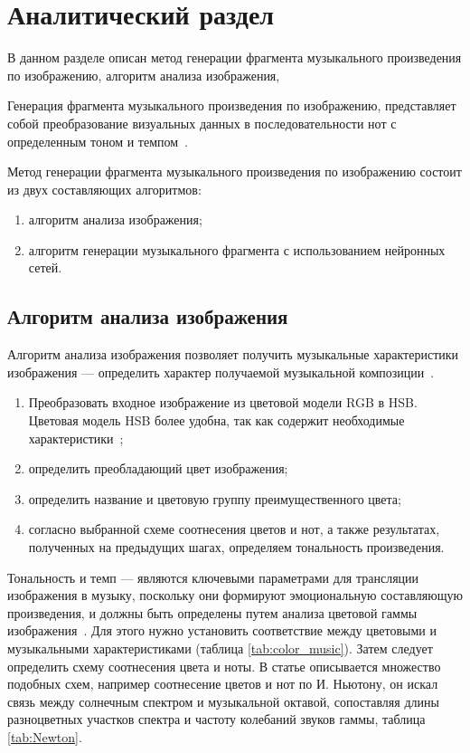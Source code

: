 \chapter{Аналитический раздел}

В данном разделе описан метод генерации фрагмента музыкального произведения по изображению, алгоритм анализа изображения, 

Генерация фрагмента музыкального произведения по изображению, представляет собой преобразование визуальных данных в последовательности нот с определенным тоном и темпом~\cite{alg}. 

Метод генерации фрагмента музыкального произведения по изображению состоит из двух составляющих алгоритмов: 
\begin{enumerate}
	\item алгоритм анализа изображения; %
	\item алгоритм генерации музыкального фрагмента с использованием нейронных сетей.
\end{enumerate}	

\section{Алгоритм анализа изображения}

Алгоритм анализа изображения позволяет получить музыкальные характеристики изображения --- определить характер получаемой музыкальной композиции~\cite{alg}.

\begin{enumerate}
	\item Преобразовать входное изображение из цветовой модели RGB в HSB.
	Цветовая модель HSB более удобна, так как содержит необходимые характеристики~\cite{alg};
	\item определить преобладающий цвет изображения;
	\item определить название и цветовую группу преимущественного цвета;
	\item согласно выбранной схеме соотнесения цветов и нот, а также результатах, полученных на предыдущих шагах, определяем тональность произведения.
\end{enumerate}

Тональность и темп --- являются ключевыми параметрами для трансляции изображения в музыку, поскольку они формируют эмоциональную составляющую произведения, и должны быть определены путем анализа цветовой гаммы изображения~\cite{actuality}. Для этого нужно установить соответствие между цветовыми и музыкальными характеристиками \cite{web} (таблица \ref{tab:color_music}). Затем следует определить схему соотнесения цвета и ноты\cite{web}. В статье \cite{colortonote} описывается множество подобных схем, например соотнесение цветов и нот по И. Ньютону, он искал связь между солнечным спектром и музыкальной октавой, сопоставляя длины разноцветных участков спектра и частоту колебаний звуков гаммы, таблица \ref{tab:Newton}.
	

